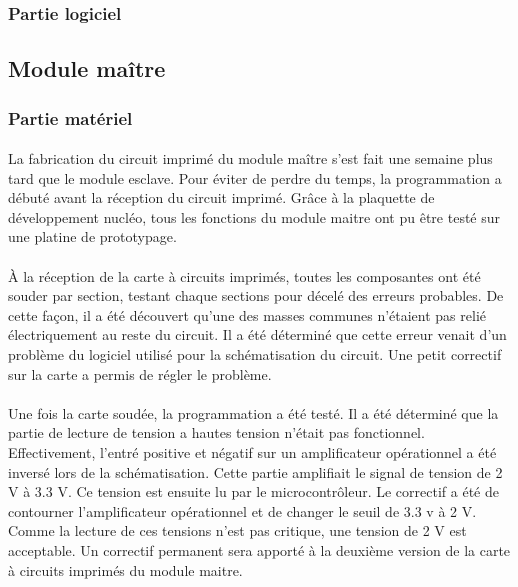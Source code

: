 		\subsubsection{Partie logiciel}
			
			\paragraph{}


	
	\subsection{Module maître}
	
		\subsubsection{Partie matériel}	
		
			\paragraph{}	
			La fabrication du circuit imprimé du module maître s’est fait une semaine plus tard que le module esclave. Pour éviter de perdre du temps, la programmation a débuté avant la réception du circuit imprimé. Grâce à la plaquette de développement nucléo, tous les fonctions du module maitre ont pu être testé sur une platine de prototypage.
			
			\paragraph{}
			À la réception de la carte à circuits imprimés, toutes les composantes ont été souder par section, testant chaque sections pour décelé des erreurs probables. De cette façon, il a été découvert qu’une des masses communes n’étaient pas relié électriquement au reste du circuit. Il a été déterminé que cette erreur venait d’un problème du logiciel utilisé pour la schématisation du circuit. Une petit correctif sur la carte a permis de régler le problème.
			
			\paragraph{}
			Une fois la carte soudée, la programmation a été testé. Il a été déterminé que la partie de lecture de tension a hautes tension n’était pas fonctionnel. Effectivement, l’entré positive et négatif sur un amplificateur opérationnel a été inversé lors de la schématisation. Cette partie amplifiait le signal de tension de 2 V à 3.3 V. Ce tension est ensuite lu par le microcontrôleur. Le correctif a été de contourner l’amplificateur opérationnel et de changer le seuil de 3.3 v à 2 V. Comme la lecture de ces tensions n’est pas critique, une tension de 2 V est acceptable. Un correctif permanent sera apporté à la deuxième version de la carte à circuits imprimés du module maitre.
		
